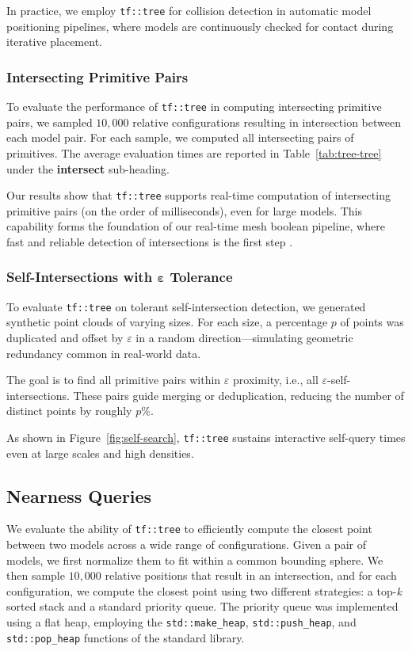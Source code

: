 In practice, we employ \texttt{tf::tree} for collision detection in
automatic model positioning pipelines, where models are
continuously checked for contact during iterative placement.

\subsubsection{Intersecting Primitive Pairs}

To evaluate the performance of \texttt{tf::tree} in computing
intersecting primitive pairs, we sampled $10{,}000$ relative
configurations resulting in intersection between each model pair.
For each sample, we computed all intersecting pairs of primitives.
The average evaluation times are reported in
Table~\ref{tab:tree-tree} under the
\textbf{intersect} sub-heading.

Our results show that \texttt{tf::tree} supports real-time
computation of intersecting primitive pairs (on the order of
milliseconds), even for large models. This capability forms the
foundation of our real-time mesh boolean pipeline, where fast and
reliable detection of intersections is the first step
\cite{sajovic2025trueform}.

\subsubsection{Self-Intersections with $\mathbf{\varepsilon}$ Tolerance}

To evaluate \texttt{tf::tree} on tolerant self-intersection detection,
we generated synthetic point clouds of varying sizes. For each size,
a percentage $p$ of points was duplicated and offset by $\varepsilon$
in a random direction—simulating geometric redundancy common in
real-world data.

The goal is to find all primitive pairs within $\varepsilon$ proximity,
i.e., all $\varepsilon$-self-intersections. These pairs guide merging
or deduplication, reducing the number of distinct points by roughly $p\%$.

As shown in Figure~\ref{fig:self-search}, \texttt{tf::tree} sustains
interactive self-query times even at large scales and high densities.

\subsection{Nearness Queries}

We evaluate the ability of \texttt{tf::tree} to efficiently compute
the closest point between two models across a wide range of
configurations. Given a pair of models, we first normalize them to
fit within a common bounding sphere. We then sample $10{,}000$
relative positions that result in an intersection, and for each
configuration, we compute the closest point using two different
strategies: a top-\emph{k} sorted stack and a standard priority queue.
The priority queue was implemented using a flat heap, employing the
\texttt{std::make\_heap}, \texttt{std::push\_heap}, and
\texttt{std::pop\_heap} functions of the standard \cpp library.

